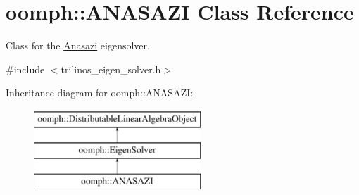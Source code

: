 \hypertarget{classoomph_1_1ANASAZI}{}\section{oomph\+:\+:A\+N\+A\+S\+A\+ZI Class Reference}
\label{classoomph_1_1ANASAZI}


Class for the \hyperlink{namespaceAnasazi}{Anasazi} eigensolver.  




{\ttfamily \#include $<$trilinos\+\_\+eigen\+\_\+solver.\+h$>$}

Inheritance diagram for oomph\+:\+:A\+N\+A\+S\+A\+ZI\+:\begin{figure}[H]
\begin{center}
\leavevmode
\includegraphics[height=3.000000cm]{classoomph_1_1ANASAZI}
\end{center}
\end{figure}
